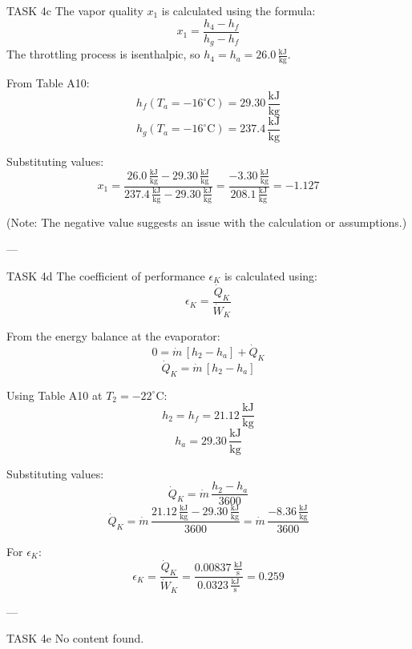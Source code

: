 TASK 4c  
The vapor quality \( x_1 \) is calculated using the formula:  
\[
x_1 = \frac{h_4 - h_f}{h_{g} - h_f}
\]  
The throttling process is isenthalpic, so \( h_4 = h_a = 26.0 \, \frac{\text{kJ}}{\text{kg}} \).  

From Table A10:  
\[
h_f(T_a = -16^\circ\text{C}) = 29.30 \, \frac{\text{kJ}}{\text{kg}}
\]  
\[
h_g(T_a = -16^\circ\text{C}) = 237.4 \, \frac{\text{kJ}}{\text{kg}}
\]  

Substituting values:  
\[
x_1 = \frac{26.0 \, \frac{\text{kJ}}{\text{kg}} - 29.30 \, \frac{\text{kJ}}{\text{kg}}}{237.4 \, \frac{\text{kJ}}{\text{kg}} - 29.30 \, \frac{\text{kJ}}{\text{kg}}} = \frac{-3.30 \, \frac{\text{kJ}}{\text{kg}}}{208.1 \, \frac{\text{kJ}}{\text{kg}}} = -1.127
\]  

(Note: The negative value suggests an issue with the calculation or assumptions.)  

---

TASK 4d  
The coefficient of performance \( \epsilon_K \) is calculated using:  
\[
\epsilon_K = \frac{\dot{Q}_K}{\dot{W}_K}
\]  

From the energy balance at the evaporator:  
\[
0 = \dot{m} \, [h_2 - h_a] + \dot{Q}_K
\]  
\[
\dot{Q}_K = \dot{m} \, [h_2 - h_a]
\]  

Using Table A10 at \( T_2 = -22^\circ\text{C} \):  
\[
h_2 = h_f = 21.12 \, \frac{\text{kJ}}{\text{kg}}
\]  
\[
h_a = 29.30 \, \frac{\text{kJ}}{\text{kg}}
\]  

Substituting values:  
\[
\dot{Q}_K = \dot{m} \, \frac{h_2 - h_a}{\text{3600}}
\]  
\[
\dot{Q}_K = \dot{m} \, \frac{21.12 \, \frac{\text{kJ}}{\text{kg}} - 29.30 \, \frac{\text{kJ}}{\text{kg}}}{\text{3600}} = \dot{m} \, \frac{-8.36 \, \frac{\text{kJ}}{\text{kg}}}{\text{3600}}
\]  

For \( \epsilon_K \):  
\[
\epsilon_K = \frac{\dot{Q}_K}{\dot{W}_K} = \frac{0.00837 \, \frac{\text{kJ}}{\text{s}}}{0.0323 \, \frac{\text{kJ}}{\text{s}}} = 0.259
\]  

---

TASK 4e  
No content found.